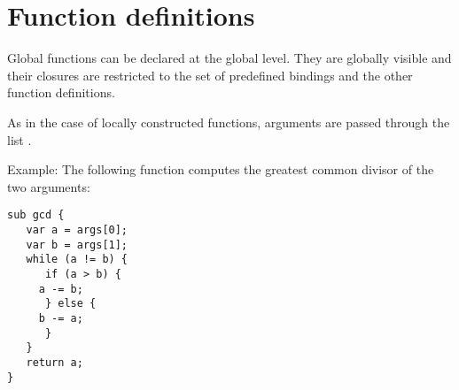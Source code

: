 \chapter{Function definitions}\label{functiondef}

Global functions can be declared at the global level. They are
globally visible and their closures are restricted
to the set of predefined bindings and the other function definitions.

\begin{grammar}
      \produces {}  
\end{grammar}

\noindent
As in the case of locally constructed functions, arguments are passed
through the list .

Example: The following function computes the greatest common divisor
of the two arguments:

\begin{lstlisting}
sub gcd {
   var a = args[0];
   var b = args[1];
   while (a != b) {
      if (a > b) {
	 a -= b;
      } else {
	 b -= a;
      }
   }
   return a;
}
\end{lstlisting}

\endinput
